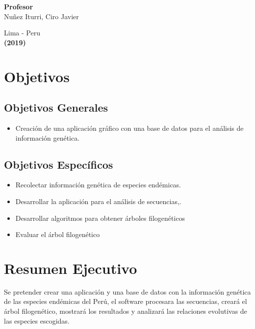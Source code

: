\documentclass[a4paper]{article}
\begin{document}
\begin{titlepage}
\begin{center}
\begin{large}
{\bf Profesor} 
\vspace*{0.1in}
\\Nuñez Iturri, Ciro Javier
\end{large}

\end{center}
\begin{center}
\begin{large}
\vspace*{1.0in}
Lima - Peru\\
{\bf (2019)}
\end{large}
\end{center}
\end{titlepage}

\pagebreak
\tableofcontents
\pagebreak

\section{Objetivos}

\subsection{Objetivos Generales}
\begin{itemize}
\item  Creación de una aplicación gráfico con una base de datos para el análisis de información genética.
\end{itemize}

\subsection{Objetivos Específicos}

\begin{itemize}
\item Recolectar información genética de especies endémicas.
\item Desarrollar la aplicación para el análisis de secuencias,.
\item Desarrollar algoritmos para obtener árboles filogenéticos 
\item Evaluar el árbol filogenético
\end{itemize}

\section{Resumen Ejecutivo}

Se pretender crear una aplicación y una base de datos con la información genética de las especies endémicas del Perú, el software procesara las secuencias, creará el árbol filogenético, mostrará los resultados y analizará las relaciones evolutivas de las especies escogidas.
\end{document}
